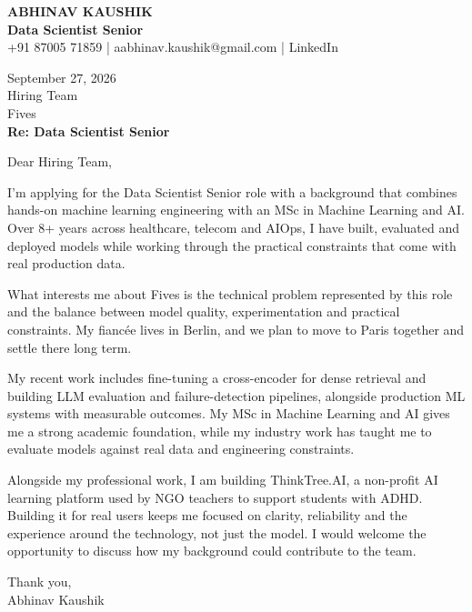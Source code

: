 \documentclass[10pt,a4paper]{article}
\begin{document}
\begin{center}
{\Large\bfseries ABHINAV KAUSHIK}\\[2pt]
{\bfseries Data Scientist Senior}\\[2pt]
+91 87005 71859 \quad | \quad aabhinav.kaushik@gmail.com \quad | \quad LinkedIn
\end{center}
\vspace{8pt}
September 27, 2026\\[6pt]
Hiring Team\\
Fives\\[4pt]
\textbf{Re: Data Scientist Senior}

Dear Hiring Team,

I’m applying for the Data Scientist Senior role with a background that combines hands-on machine learning engineering with an MSc in Machine Learning and AI. Over 8+ years across healthcare, telecom and AIOps, I have built, evaluated and deployed models while working through the practical constraints that come with real production data.

What interests me about Fives is the technical problem represented by this role and the balance between model quality, experimentation and practical constraints. My fiancée lives in Berlin, and we plan to move to Paris together and settle there long term.

My recent work includes fine-tuning a cross-encoder for dense retrieval and building LLM evaluation and failure-detection pipelines, alongside production ML systems with measurable outcomes. My MSc in Machine Learning and AI gives me a strong academic foundation, while my industry work has taught me to evaluate models against real data and engineering constraints.

Alongside my professional work, I am building ThinkTree.AI, a non-profit AI learning platform used by NGO teachers to support students with ADHD. Building it for real users keeps me focused on clarity, reliability and the experience around the technology, not just the model. I would welcome the opportunity to discuss how my background could contribute to the team.

Thank you,\\
Abhinav Kaushik
\end{document}
